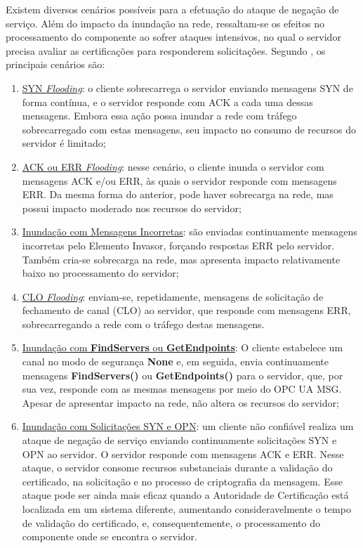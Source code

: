    Existem diversos cenários possíveis para a efetuação do ataque de negação de serviço. Além do impacto da inundação na rede, ressaltam-se os efeitos no processamento do componente ao sofrer ataques intensivos, no qual o servidor precisa avaliar as certificações para responderem solicitações. Segundo , os principais cenários são:

    \begin{enumerate}
        \item \underline{SYN \textit{Flooding}}: o cliente sobrecarrega o servidor enviando mensagens SYN de forma contínua, e o servidor responde com ACK a cada uma dessas mensagens. Embora essa ação possa inundar a rede com tráfego sobrecarregado com estas mensagens, seu impacto no consumo de recursos do servidor é limitado;
        \item \underline{ACK ou ERR \textit{Flooding}}: nesse cenário, o cliente inunda o servidor com mensagens ACK e/ou ERR, às quais o servidor responde com mensagens ERR. Da mesma forma do anterior, pode haver sobrecarga na rede, mas possui impacto moderado nos recursos do servidor;
        \item \underline{Inundação com Mensagens Incorretas}: são enviadas continuamente mensagens incorretas pelo Elemento Invasor, forçando respostas ERR pelo servidor. Também cria-se sobrecarga na rede, mas apresenta impacto relativamente baixo no processamento do servidor;
        \item \underline{CLO \textit{Flooding}}: enviam-se, repetidamente, mensagens de solicitação de fechamento de canal (CLO) ao servidor, que responde com mensagens ERR, sobrecarregando a rede com o tráfego destas mensagens.
        \item \underline{Inundação com \textbf{FindServers} ou \textbf{GetEndpoints}}: O cliente estabelece um canal no modo de segurança \textbf{None} e, em seguida, envia continuamente mensagens \textbf{FindServers()} ou \textbf{GetEndpoints()} para o servidor, que, por sua vez, responde com as mesmas mensagens por meio do OPC UA MSG. Apesar de apresentar impacto na rede, não altera os recursos do servidor;
        \item \underline{Inundação com Solicitações SYN e OPN}: um cliente não confiável realiza um ataque de negação de serviço enviando continuamente solicitações SYN e OPN ao servidor. O servidor responde com mensagens ACK e ERR. Nesse ataque, o servidor consome recursos substanciais durante a validação do certificado, na solicitação e no processo de criptografia da mensagem. Esse ataque pode ser ainda mais eficaz quando a Autoridade de Certificação está localizada em um sistema diferente, aumentando consideravelmente o tempo de validação do certificado, e, consequentemente, o processamento do componente onde se encontra o servidor.
    \end{enumerate}

